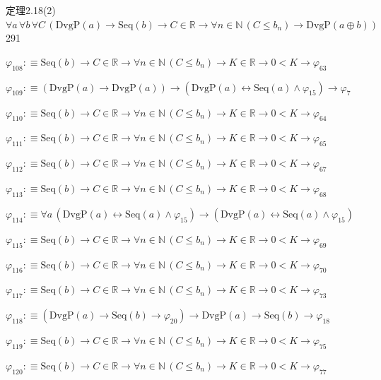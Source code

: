 \begin{fullproof}{定理2.18(2)}{$\forall a\,\forall b\,\forall C\,(\mathrm{DvgP}(a) \to \mathrm{Seq}(b) \to C \in \mathbb{R} \to \forall n \in \mathbb{N}\,(C \leq b_{n}) \to \mathrm{DvgP}(a \oplus b))$}{291}
\begin{abbrevlist}
\item $\varphi_{108} :\equiv \mathrm{Seq}(b) \to C \in \mathbb{R} \to \forall n \in \mathbb{N}\,(C \leq b_{n}) \to K \in \mathbb{R} \to 0 < K \to \varphi_{63}$
\item $\varphi_{109} :\equiv (\mathrm{DvgP}(a) \to \mathrm{DvgP}(a)) \to (\mathrm{DvgP}(a) \leftrightarrow \mathrm{Seq}(a) \land \varphi_{15}) \to \varphi_{7}$
\item $\varphi_{110} :\equiv \mathrm{Seq}(b) \to C \in \mathbb{R} \to \forall n \in \mathbb{N}\,(C \leq b_{n}) \to K \in \mathbb{R} \to 0 < K \to \varphi_{64}$
\item $\varphi_{111} :\equiv \mathrm{Seq}(b) \to C \in \mathbb{R} \to \forall n \in \mathbb{N}\,(C \leq b_{n}) \to K \in \mathbb{R} \to 0 < K \to \varphi_{65}$
\item $\varphi_{112} :\equiv \mathrm{Seq}(b) \to C \in \mathbb{R} \to \forall n \in \mathbb{N}\,(C \leq b_{n}) \to K \in \mathbb{R} \to 0 < K \to \varphi_{67}$
\item $\varphi_{113} :\equiv \mathrm{Seq}(b) \to C \in \mathbb{R} \to \forall n \in \mathbb{N}\,(C \leq b_{n}) \to K \in \mathbb{R} \to 0 < K \to \varphi_{68}$
\item $\varphi_{114} :\equiv \forall a\,(\mathrm{DvgP}(a) \leftrightarrow \mathrm{Seq}(a) \land \varphi_{15}) \to (\mathrm{DvgP}(a) \leftrightarrow \mathrm{Seq}(a) \land \varphi_{15})$
\item $\varphi_{115} :\equiv \mathrm{Seq}(b) \to C \in \mathbb{R} \to \forall n \in \mathbb{N}\,(C \leq b_{n}) \to K \in \mathbb{R} \to 0 < K \to \varphi_{69}$
\item $\varphi_{116} :\equiv \mathrm{Seq}(b) \to C \in \mathbb{R} \to \forall n \in \mathbb{N}\,(C \leq b_{n}) \to K \in \mathbb{R} \to 0 < K \to \varphi_{70}$
\item $\varphi_{117} :\equiv \mathrm{Seq}(b) \to C \in \mathbb{R} \to \forall n \in \mathbb{N}\,(C \leq b_{n}) \to K \in \mathbb{R} \to 0 < K \to \varphi_{73}$
\item $\varphi_{118} :\equiv (\mathrm{DvgP}(a) \to \mathrm{Seq}(b) \to \varphi_{20}) \to \mathrm{DvgP}(a) \to \mathrm{Seq}(b) \to \varphi_{18}$
\item $\varphi_{119} :\equiv \mathrm{Seq}(b) \to C \in \mathbb{R} \to \forall n \in \mathbb{N}\,(C \leq b_{n}) \to K \in \mathbb{R} \to 0 < K \to \varphi_{75}$
\item $\varphi_{120} :\equiv \mathrm{Seq}(b) \to C \in \mathbb{R} \to \forall n \in \mathbb{N}\,(C \leq b_{n}) \to K \in \mathbb{R} \to 0 < K \to \varphi_{77}$

\end{abbrevlist}
\end{fullproof}
